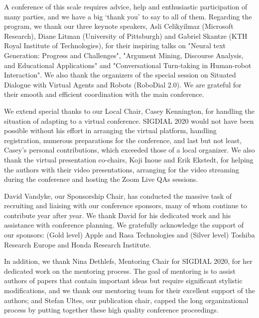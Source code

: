 A conference of this scale requires advice, help and enthusiastic participation of many parties, and we have a big `thank you' to say to all of them. Regarding the program, we thank our three keynote speakers, Asli Celikyilmaz (Microsoft Research), Diane Litman (University of Pittsburgh) and Gabriel Skantze (KTH Royal Institute of Technologies),   for their inspiring talks on "Neural text Generation: Progress and Challenges", "Argument Mining, Discourse Analysis, and Educational Applications" and "Conversational Turn-taking in Human-robot Interaction". 
We also thank the organizers of the special session on Situated Dialogue with Virtual Agents and Robots (RoboDial 2.0). We are grateful for their smooth and efficient coordination with the main conference.

We extend special thanks to our Local Chair, Casey Kennington, for handling the  situation of adapting to a virtual conference. SIGDIAL 2020 would not have been possible without his effort in arranging the virtual platform, handling registration, numerous preparations for the conference, and last but not least, Casey's personal contributions, which exceeded those of a local organizer. We also thank the virtual presentation co-chairs, Koji Inoue and Erik Ekstedt, for helping the authors with their video presentations, arranging for the video streaming during the conference and hosting the Zoom Live QAs sessions. 

David Vandyke, our Sponsorship Chair, has conducted the massive task of recruiting and liaising with our conference sponsors, many of whom continue to contribute year after year. We thank David for his dedicated work and his assistance with conference planning. We gratefully acknowledge the support of our sponsors: (Gold level) Apple and Rasa Technologies and (Silver level) Toshiba Research Europe and Honda Research Institute. %

In addition, we thank Nina Dethlefs, Mentoring Chair for SIGDIAL 2020, for her dedicated work on the mentoring process. The goal of mentoring is to assist authors of papers that contain important ideas but require significant stylistic modifications, and we thank our mentoring team for their excellent support of the authors; and Stefan Ultes, our publication chair, capped the long organizational process by putting together these high quality conference proceedings.


